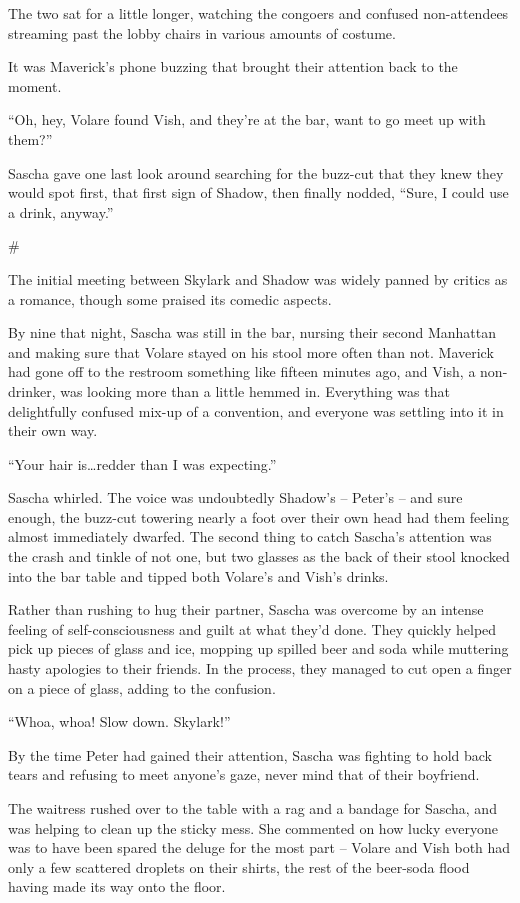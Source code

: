 \documentclass[12pt,letterpaper,oneside]{memoir}
\newcommand\secdiv{
  \begin{center}
    \#
  \end{center}
}
\begin{document}
  The two sat for a little longer, watching the congoers and confused non-attendees streaming past the lobby chairs in various amounts of costume.

  It was Maverick's phone buzzing that brought their attention back to the moment.

  ``Oh, hey, Volare found Vish, and they're at the bar, want to go meet up with them?''

  Sascha gave one last look around searching for the buzz-cut that they knew they would spot first, that first sign of Shadow, then finally nodded, ``Sure, I could use a drink, anyway.''

  \secdiv

  The initial meeting between Skylark and Shadow was widely panned by critics as a romance, though some praised its comedic aspects.

  By nine that night, Sascha was still in the bar, nursing their second Manhattan and making sure that Volare stayed on his stool more often than not. Maverick had gone off to the restroom something like fifteen minutes ago, and Vish, a non-drinker, was looking more than a little hemmed in. Everything was that delightfully confused mix-up of a convention, and everyone was settling into it in their own way.

  ``Your hair is\ldots{}redder than I was expecting.''

  Sascha whirled. The voice was undoubtedly Shadow's -- Peter's -- and sure enough, the buzz-cut towering nearly a foot over their own head had them feeling almost immediately dwarfed. The second thing to catch Sascha's attention was the crash and tinkle of not one, but two glasses as the back of their stool knocked into the bar table and tipped both Volare's and Vish's drinks.

  Rather than rushing to hug their partner, Sascha was overcome by an intense feeling of self-consciousness and guilt at what they'd done. They quickly helped pick up pieces of glass and ice, mopping up spilled beer and soda while muttering hasty apologies to their friends. In the process, they managed to cut open a finger on a piece of glass, adding to the confusion.

  ``Whoa, whoa! Slow down. Skylark!''

  By the time Peter had gained their attention, Sascha was fighting to hold back tears and refusing to meet anyone's gaze, never mind that of their boyfriend.

  The waitress rushed over to the table with a rag and a bandage for Sascha, and was helping to clean up the sticky mess. She commented on how lucky everyone was to have been spared the deluge for the most part -- Volare and Vish both had only a few scattered droplets on their shirts, the rest of the beer-soda flood having made its way onto the floor.
\end{document}
